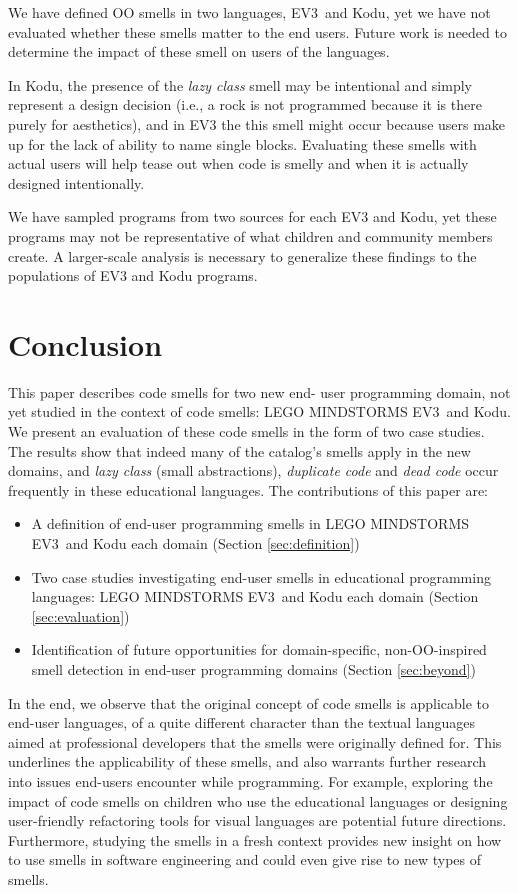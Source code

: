 \documentclass[conference]{IEEEtran}
\newcommand{\ms}{LEGO MINDSTORMS EV3}
\begin{document}
We have defined OO smells in two languages, EV3~and Kodu, yet we have not evaluated whether these smells matter to the end users. Future work is needed to determine the impact of these smell on users of the languages. 

In Kodu, the presence of the \emph{lazy class} smell may be intentional and simply represent a design decision (i.e., a rock is not programmed because it is there purely for aesthetics), and in EV3 the this smell might occur because users make up for the lack of ability to name single blocks. Evaluating these smells with actual users will help tease out when code is smelly and when it is actually designed intentionally. 

We have sampled programs from two sources for each EV3 and Kodu, yet these programs may not be representative of what children and community members create. A larger-scale analysis is necessary to generalize these findings to the populations of EV3 and Kodu programs. 

\section{Conclusion}
\label{sec:conclusions}
This paper describes code smells for two new end- user programming domain, not yet studied in the context of code smells: \ms~and Kodu. We present an evaluation of these code smells in the form of two case studies. The results show that indeed many of the catalog's smells apply in the new domains, and \emph{lazy class} (small abstractions), \emph{duplicate code} and \emph{dead code} occur frequently in these educational languages. The contributions of this paper are:

\begin{itemize} \itemsep -0.25pt
	\item A definition of end-user programming smells in \ms~and Kodu each domain (Section \ref{sec:definition})
	\item Two case studies investigating end-user smells in educational programming languages: \ms~and Kodu each domain  (Section \ref{sec:evaluation})
	\item Identification of future opportunities for domain-specific, non-OO-inspired smell detection in end-user programming domains (Section \ref {sec:beyond})
\end{itemize}

In the end, we observe that the original concept of code smells is applicable to end-user languages, of a quite different character than the textual languages aimed at professional developers that the smells were originally defined for. This underlines the applicability of these smells, and also warrants further research into issues end-users encounter while programming. For example, exploring the impact of code smells on children who use the educational languages or designing user-friendly refactoring tools for visual languages are potential future directions. 
Furthermore, studying the smells in a fresh context provides new insight on how to use smells in software engineering and could even give rise to new types of smells. 
\end{document}
